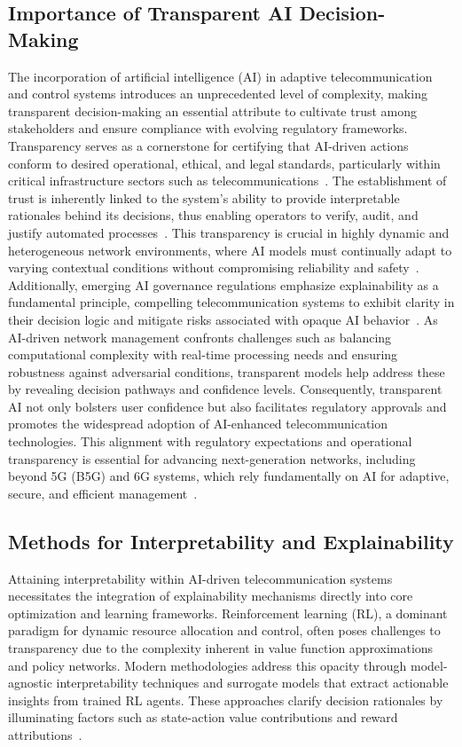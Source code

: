 \documentclass[sigconf]{acmart}
\begin{document}
\subsection{Importance of Transparent AI Decision-Making}

The incorporation of artificial intelligence (AI) in adaptive telecommunication and control systems introduces an unprecedented level of complexity, making transparent decision-making an essential attribute to cultivate trust among stakeholders and ensure compliance with evolving regulatory frameworks. Transparency serves as a cornerstone for certifying that AI-driven actions conform to desired operational, ethical, and legal standards, particularly within critical infrastructure sectors such as telecommunications~\cite{ref7,ref13}. The establishment of trust is inherently linked to the system’s ability to provide interpretable rationales behind its decisions, thus enabling operators to verify, audit, and justify automated processes~\cite{ref15}. This transparency is crucial in highly dynamic and heterogeneous network environments, where AI models must continually adapt to varying contextual conditions without compromising reliability and safety~\cite{ref48}. Additionally, emerging AI governance regulations emphasize explainability as a fundamental principle, compelling telecommunication systems to exhibit clarity in their decision logic and mitigate risks associated with opaque AI behavior~\cite{ref50}. As AI-driven network management confronts challenges such as balancing computational complexity with real-time processing needs and ensuring robustness against adversarial conditions, transparent models help address these by revealing decision pathways and confidence levels. Consequently, transparent AI not only bolsters user confidence but also facilitates regulatory approvals and promotes the widespread adoption of AI-enhanced telecommunication technologies. This alignment with regulatory expectations and operational transparency is essential for advancing next-generation networks, including beyond 5G (B5G) and 6G systems, which rely fundamentally on AI for adaptive, secure, and efficient management~\cite{ref7,ref13,ref50}.

\subsection{Methods for Interpretability and Explainability}

Attaining interpretability within AI-driven telecommunication systems necessitates the integration of explainability mechanisms directly into core optimization and learning frameworks. Reinforcement learning (RL), a dominant paradigm for dynamic resource allocation and control, often poses challenges to transparency due to the complexity inherent in value function approximations and policy networks. Modern methodologies address this opacity through model-agnostic interpretability techniques and surrogate models that extract actionable insights from trained RL agents. These approaches clarify decision rationales by illuminating factors such as state-action value contributions and reward attributions~\cite{ref3,ref5}. 
\end{document}
